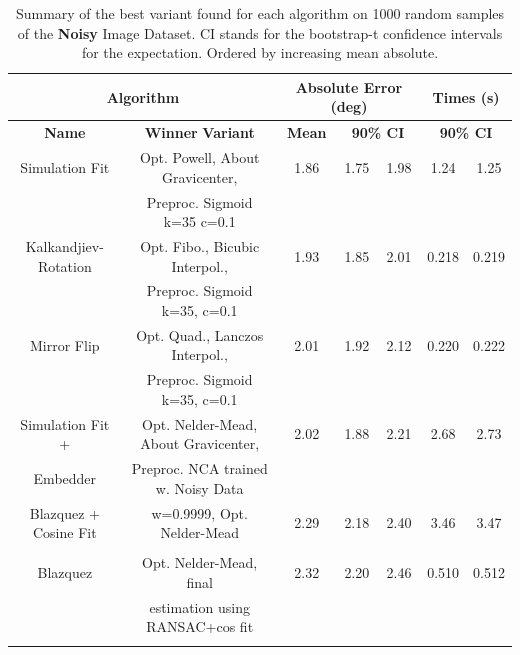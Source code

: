 \documentclass[11pt, a4paper, twoside]{article} %
\begin{document}
\begin{table}[h!]
\caption{Summary of the best variant found for each algorithm on 1000 random samples of the {\bf Noisy} Image Dataset. CI stands for the bootstrap-t confidence intervals for the expectation. Ordered by increasing mean absolute.}\label{tab:noisy}

\hspace{-0.6cm}\begin{tabular}{c|c|c|cc|cc}
\toprule
 \multicolumn{2}{c|}{\bf Algorithm} &  \multicolumn{3}{|c|}{\bf Absolute Error (deg)} & \multicolumn{2}{|c}{\bf Times (s)} \\ \midrule \midrule
{\bf                     Name} &                          {\bf Winner} {\bf Variant} &  {\bf Mean} &  \multicolumn{2}{c|}{\bf 90\% CI } &  \multicolumn{2}{|c}{\bf 90\% CI }\\
\bottomrule\rule{0pt}{4mm}{}
           Simulation Fit &         Opt. Powell, About Gravicenter, &  1.86 &       1.75 &      1.98 &         1.24 &        1.25 \\
                          &             Preproc. Sigmoid k=35 c=0.1 &       &            &           &              &             \\ \hline\rule{0pt}{4mm}{}Kalkandjiev-Rotation &         Opt. Fibo., Bicubic Interpol.,  &  1.93 &       1.85 &      2.01 &         0.218 &        0.219 \\
                          &            Preproc. Sigmoid k=35, c=0.1 &       &            &           &              &             \\ \hline
              \rule{0pt}{4mm}{}Mirror Flip &         Opt. Quad., Lanczos Interpol.,  &  2.01 &       1.92 &      2.12 &         0.220 &        0.222 \\
                          &            Preproc. Sigmoid k=35, c=0.1 &       &            &           &              &             \\ \hline
\rule{0pt}{4mm}{}Simulation Fit + &   Opt. Nelder-Mead, About Gravicenter,  &  2.02 &       1.88 &      2.21 &         2.68 &        2.73 \\
                         Embedder  &      Preproc. NCA trained w. Noisy Data &       &            &           &              &             \\ \hline
    \rule{0pt}{4mm}{}Blazquez + Cosine Fit &              w=0.9999, Opt. Nelder-Mead &  2.29 &       2.18 &      2.40 &         3.46 &        3.47 \\
                          &                                         &       &            &           &              &             \\ \hline
                 \rule{0pt}{4mm}{}Blazquez &                Opt. Nelder-Mead, final  &  2.32 &       2.20 &      2.46 &         0.510 &        0.512 \\ 
                          &         estimation using RANSAC+cos fit &       &            &           &              &             \\ \hline
           \rule{0pt}{4mm}{}                    
           

\end{tabular}
\end{table}
\end{document}
